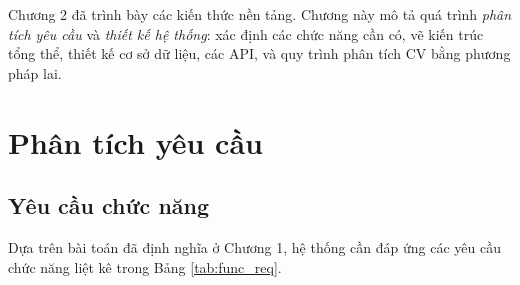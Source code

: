 \documentclass[../DoAn.tex]{subfiles}
\begin{document}
Chương 2 đã trình bày các kiến thức nền tảng. Chương này mô tả quá trình \textit{phân tích yêu cầu} và \textit{thiết kế hệ thống}: xác định các chức năng cần có, vẽ kiến trúc tổng thể, thiết kế cơ sở dữ liệu, các API, và quy trình phân tích CV bằng phương pháp lai.

\section{Phân tích yêu cầu}

\subsection{Yêu cầu chức năng}

Dựa trên bài toán đã định nghĩa ở Chương 1, hệ thống cần đáp ứng các yêu cầu chức năng liệt kê trong Bảng \ref{tab:func_req}.
\end{document}
